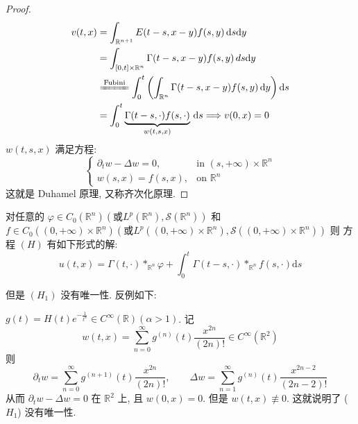 \documentclass[11pt]{ctexart}[UTF8]
\begin{document}
\begin{proof}
   \begin{equation*}
    \begin{aligned}
        v(t,x) &= \int_{\mathbb{R}^{n+1}} E(t-s, x-y) f(s,y) \,\mathrm{d}s\mathrm{d}y\\
        &= \int_{[0,t]\times\mathbb{R}^n} \Gamma(t-s, x-y) f(s,y) \,ds\mathrm{d}y\\
        &\xlongequal{\text{Fubini}} \int_{0}^{t} \left( \int_{\mathbb{R}^n} \Gamma(t-s, x-y) f(s,y) \,\mathrm{d}y \right) \mathrm{d}s\\
        &= \int_{0}^{t} \underbrace{\Gamma(t-s, \cdot) f(s,\cdot)}_{w(t,s,x)} \,\mathrm{d}s \Longrightarrow v(0,x) = 0
    \end{aligned}
   \end{equation*}
$ w(t,s,x) $ 满足方程:
\begin{equation*}
    \begin{cases}
    \partial_{t} w - \Delta w = 0, & \text{in } (s,+\infty)\times\mathbb{R}^n\\
    w(s,x) = f(s,x), & \text{on } \mathbb{R}^n
    \end{cases}
\end{equation*}
这就是 Duhamel 原理, 又称齐次化原理.
\end{proof}
\begin{corollary}
    对任意的 $\varphi \in C_{0}(\mathbb{R}^{n})(\text{或} L^{p}(\mathbb{R}^{n}),\mathscr{S}(\mathbb{R}^{n}))$ 和 $f \in C_{0}((0,+\infty)\times\mathbb{R}^{n})(\text{或} L^{p}((0,+\infty)\times\mathbb{R}^{n}), \mathscr{S}((0,+\infty)\times\mathbb{R}^{n}))$ 则
    方程 $(H)$ 有如下形式的解:
    \begin{equation*}
        u(t,x) = \Gamma(t,\cdot) \ast_{\mathbb{R}^{n}} \varphi + \int_{0}^{t} \Gamma(t-s, \cdot) \ast_{\mathbb{R}^{n}} f(s,\cdot) \mathrm{d}s
    \end{equation*}
\end{corollary}
但是 $(H_{1})$ 没有唯一性. 反例如下:
\begin{example}
    $g(t) = H(t)e^{-\frac{1}{t^{\alpha}}}\in C^{\infty}(\mathbb{R})(\alpha>1)$. 记
    \begin{equation*}
        w(t,x) =  \sum_{n=0}^{\infty}g^{(n)}(t) \frac{x^{2n}}{(2n)!}\in C^{\infty}(\mathbb{R}^2)
    \end{equation*}
    则
    \begin{equation*}
        \partial_{t} w = \sum_{n=0}^{\infty} g^{(n+1)}(t) \frac{x^{2n}}{(2n)!},\quad\quad \Delta w = \sum_{n=1}^{\infty} g^{(n)}(t) \frac{x^{2n-2}}{(2n-2)!}
    \end{equation*}
    从而 $\partial_{t} w - \Delta w = 0$ 在 $\mathbb{R}^2$ 上, 且 $w(0,x) = 0$. 但是 $w(t,x) \not\equiv 0$. 这就说明了 ($H_{1}$) 没有唯一性.
\end{example}
\end{document}
